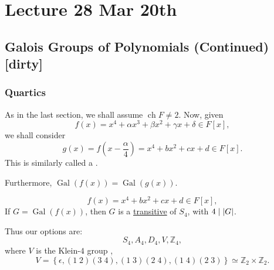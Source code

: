 \documentclass[notoc,notitlepage,nobib]{tufte-book}
\DeclareMathOperator{\Gal}{Gal}
\DeclareMathOperator{\ch}{ch}
\begin{document}


\chapter{Lecture 28 Mar 20th}%
\label{chp:lecture_28_mar_20th}

\section{Galois Groups of Polynomials (Continued) [dirty]}%
\label{sec:galois_groups_of_polynomials_continued}

\subsection{Quartics}%
\label{sub:quartics}

As in the last section, we shall assume $\ch F \neq 2$. Now, given
\begin{equation*}
  f(x) = x^4 + \alpha x^3 + \beta x^2 + \gamma x + \delta \in F[x],
\end{equation*}
we shall consider
\begin{equation*}
  g(x) = f\left(x - \frac{\alpha}{4}\right) = x^4 + bx^2 + cx + d \in F[x].
\end{equation*}
This is similarly called a .

Furthermore, $\Gal(f(x)) = \Gal(g(x))$. 

\begin{equation*}
  f(x) = x^4 + b x^2 + c x + d \in F[x],
\end{equation*}
If $G = \Gal(f(x))$, then $G$ is a
\hyperref[defn:transitive_subgroup]{transitive} of $S_4$, with $4 \mid \left|G\right|$.

Thus our options are:
\begin{equation*}
  S_4, A_4, D_4, V, \mathbb{Z}_4,
\end{equation*}
where $V$ is the Klein-$4$ group ,
\begin{equation*}
  V = \left\{ \epsilon, (1 \; 2)(3 \; 4), (1 \; 3)(2 \; 4), (1\; 4)(2 \; 3)
  \right\} \simeq \mathbb{Z}_2 \times \mathbb{Z}_2.
\end{equation*}
\end{document}
